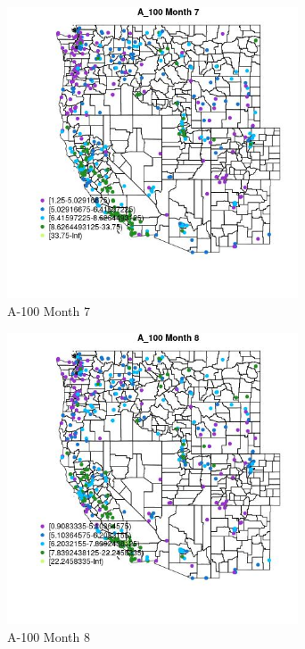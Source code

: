 \begin{figure} 
\centering  
\includegraphics[width=0.77\textwidth]{Code_Outputs/ML_input_report_ML_input_PM25_Step5_part_d_de_duplicated_aves_ML_input_MapObsMo7A_100.jpg} 
\caption{\label{fig:ML_input_report_ML_input_PM25_Step5_part_d_de_duplicated_aves_ML_inputMapObsMo7A_100}A-100 Month 7} 
\end{figure} 
 

\clearpage 

\begin{figure} 
\centering  
\includegraphics[width=0.77\textwidth]{Code_Outputs/ML_input_report_ML_input_PM25_Step5_part_d_de_duplicated_aves_ML_input_MapObsMo8A_100.jpg} 
\caption{\label{fig:ML_input_report_ML_input_PM25_Step5_part_d_de_duplicated_aves_ML_inputMapObsMo8A_100}A-100 Month 8} 
\end{figure} 
 

